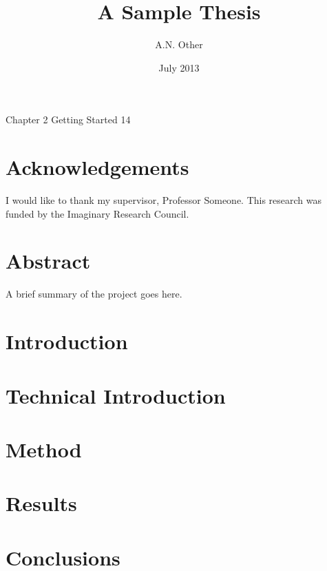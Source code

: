 \documentclass[fontsize=11pt,bibliography=totoc]{scrbook}
\title{A Sample Thesis}
\author{A.N. Other}
\date{July 2013}
\begin{document}
\maketitle





\frontmatter
\tableofcontents
\listoffigures
\listoftables
Chapter 2 Getting Started 14
\chapter{Acknowledgements}
I would like to thank my supervisor, Professor Someone. This
research was funded by the Imaginary Research Council.
\chapter{Abstract}
A brief summary of the project goes here.




\mainmatter
\chapter{Introduction}
\label{ch:intro}
\chapter{Technical Introduction}
\label{ch:techintro}
\chapter{Method}
\label{ch:method}
\chapter{Results}
\label{ch:results}
\chapter{Conclusions}
\label{ch:conc}





\backmatter


\end{document}
